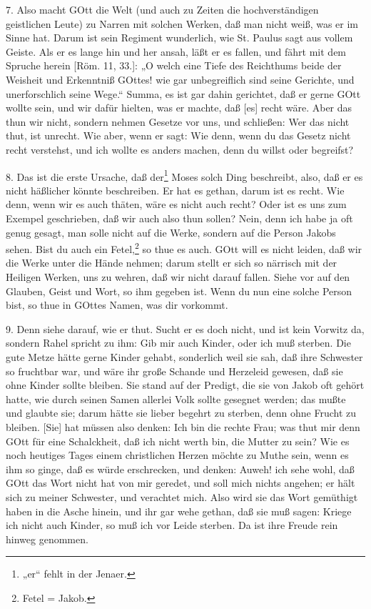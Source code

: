 7. Also macht GOtt die Welt (und auch zu Zeiten die hochverständigen geistlichen Leute) zu Narren mit solchen Werken, daß man nicht weiß, was er im Sinne hat. Darum ist sein Regiment wunderlich, wie St. Paulus sagt aus vollem Geiste. Als er es lange hin und her ansah, läßt er es fallen, und fährt mit dem Spruche herein [Röm. 11, 33.]: „O welch eine Tiefe des Reichthums beide der Weisheit und Erkenntniß GOttes! wie gar unbegreiflich sind seine Gerichte, und unerforschlich seine Wege.“ Summa, es ist gar dahin gerichtet, daß er gerne GOtt wollte sein, und wir dafür hielten, was er machte, daß [es] recht wäre. Aber das thun wir nicht, sondern nehmen Gesetze vor uns, und schließen: Wer das nicht thut, ist unrecht. Wie aber, wenn er sagt: Wie denn, wenn du das Gesetz nicht recht verstehst, und ich wollte es anders machen, denn du willst oder begreifst?

8. Das ist die erste Ursache, daß der\footnote{„er“ fehlt in der Jenaer.} Moses solch Ding beschreibt, also, daß er es nicht häßlicher könnte beschreiben. Er hat es gethan, darum ist es recht. Wie denn, wenn wir es auch thäten, wäre es nicht auch recht? Oder ist es uns zum Exempel geschrieben, daß wir auch also thun sollen? Nein, denn ich habe ja oft genug gesagt, man solle nicht auf die Werke, sondern auf die Person Jakobs sehen. Bist du auch ein Fetel,\footnote{Fetel = Jakob.} so thue es auch. GOtt will es nicht leiden, daß wir die Werke unter die Hände nehmen; darum stellt er sich so närrisch mit der Heiligen Werken, uns zu wehren, daß wir nicht darauf fallen. Siehe vor auf den Glauben, Geist und Wort, so ihm gegeben ist. Wenn du nun eine solche Person bist, so thue in GOttes Namen, was dir vorkommt.

9. Denn siehe darauf, wie er thut. Sucht er es doch nicht, und ist kein Vorwitz da, sondern Rahel spricht zu ihm: Gib mir auch Kinder, oder ich muß sterben. Die gute Metze hätte gerne Kinder gehabt, sonderlich weil sie sah, daß ihre Schwester so fruchtbar war, und wäre ihr große Schande und Herzeleid gewesen, daß sie ohne Kinder sollte bleiben. Sie stand auf der Predigt, die sie von Jakob oft gehört hatte, wie durch seinen Samen allerlei Volk sollte gesegnet werden; das mußte und glaubte sie; darum hätte sie lieber begehrt zu sterben, denn ohne Frucht zu bleiben. [Sie] hat müssen also denken: Ich bin die rechte Frau; was thut mir denn GOtt für eine Schalckheit, daß ich nicht werth bin, die Mutter zu sein? Wie es noch heutiges Tages einem christlichen Herzen möchte zu Muthe sein, wenn es ihm so ginge, daß es würde erschrecken, und denken: Auweh! ich sehe wohl, daß GOtt das Wort nicht hat von mir geredet, und soll mich nichts angehen; er hält sich zu meiner Schwester, und verachtet mich. Also wird sie das Wort gemüthigt haben in die Asche hinein, und ihr gar wehe gethan, daß sie muß sagen: Kriege ich nicht auch Kinder, so muß ich vor Leide sterben. Da ist ihre Freude rein hinweg genommen.

